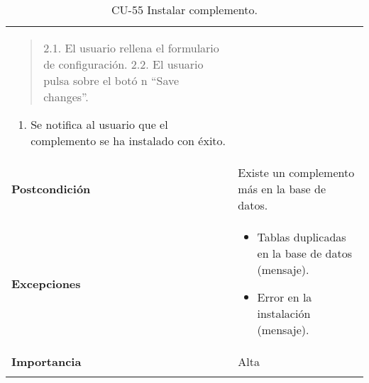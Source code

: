 \begin{longtable}[]{@{}ll@{}}
\begin{minipage}[t]{0.71\columnwidth}
\begin{quote}
2.1. El usuario rellena el formulario de configuración. 2.2. El usuario
pulsa sobre el botó n ``Save changes''.
\end{quote}

\begin{enumerate}
\def\labelenumi{\arabic{enumi}.}
\setcounter{enumi}{2}
\tightlist
\item
  Se notifica al usuario que el complemento se ha instalado con éxito.
\end{enumerate}\strut
\end{minipage}\tabularnewline
\begin{minipage}[t]{0.24\columnwidth}\raggedright
\textbf{Postcondición}\strut
\end{minipage} & \begin{minipage}[t]{0.71\columnwidth}\raggedright
Existe un complemento más en la base de datos.\strut
\end{minipage}\tabularnewline
\begin{minipage}[t]{0.24\columnwidth}\raggedright
\textbf{Excepciones}\strut
\end{minipage} & \begin{minipage}[t]{0.71\columnwidth}\raggedright
\begin{itemize}
\tightlist
\item
  Tablas duplicadas en la base de datos (mensaje).
\item
  Error en la instalación (mensaje).
\end{itemize}\strut
\end{minipage}\tabularnewline
\begin{minipage}[t]{0.24\columnwidth}\raggedright
\textbf{Importancia}\strut
\end{minipage} & \begin{minipage}[t]{0.71\columnwidth}\raggedright
Alta\strut
\end{minipage}\tabularnewline
\bottomrule
\caption{CU-55 Instalar complemento.}
\end{longtable}

